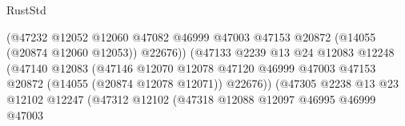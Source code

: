 \begin{lexlean}{RustStd}
\begin{coremodule}
                                                    (@47232
                                                      @12052
                                                      @12060
                                                      @47082
                                                      @46999
                                                      @47003
                                                      @47153
                                                      @20872
                                                      (@14055 (@20874 @12060 @12053))
                                                      @22676))
                                                  (@47133
                                                    @2239
                                                    @13
                                                    @24
                                                    @12083
                                                    @12248
                                                    (@47140
                                                      @12083
                                                      (@47146
                                                        @12070
                                                        @12078
                                                        @47120
                                                        @46999
                                                        @47003
                                                        @47153
                                                        @20872
                                                        (@14055 (@20874 @12078 @12071))
                                                        @22676))
                                                    (@47305
                                                      @2238
                                                      @13
                                                      @23
                                                      @12102
                                                      @12247
                                                      (@47312
                                                        @12102
                                                        (@47318
                                                          @12088
                                                          @12097
                                                          @46995
                                                          @46999
                                                          @47003

\end{coremodule}
\end{lexlean}
